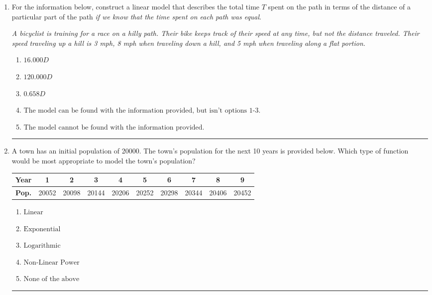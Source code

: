 \documentclass[14pt]{extbook}
\newcommand{\litem}[1]{\item#1\hspace*{-1cm}\rule{\textwidth}{0.4pt}}
\begin{document}
\begin{enumerate}
{\begin{enumerate}[label=\Alph*.]
\end{enumerate} }
\litem{
For the information below, construct a linear model that describes the total time $T$ spent on the path in terms of the distance of a particular part of the path \textit{if we know that the time spent on each path was equal}.
\begin{center}
    \textit{ A bicyclist is training for a race on a hilly path. Their bike keeps track of their speed at any time, but not the distance traveled. Their speed traveling up a hill is 3 mph, 8 mph when traveling down a hill, and 5 mph when traveling along a flat portion. }
\end{center}
\begin{enumerate}[label=\Alph*.]
\item \( 16.000 D \)
\item \( 120.000 D \)
\item \( 0.658 D \)
\item \( \text{The model can be found with the information provided, but isn't options 1-3.} \)
\item \( \text{The model cannot be found with the information provided.} \)

\end{enumerate} }
\litem{
A town has an initial population of 20000. The town's population for the next 10 years is provided below. Which type of function would be most appropriate to model the town's population?


\begin{tabular}{c|c|c|c|c|c|c|c|c|c}
\textbf{Year} & 1 & 2 & 3 & 4 & 5 & 6 & 7 & 8 & 9 \tabularnewline
\hline
\textbf{Pop.} & 20052 & 20098 & 20144 & 20206 & 20252 & 20298 & 20344 & 20406 & 20452
\end{tabular} \begin{enumerate}[label=\Alph*.]
\item \( \text{Linear} \)
\item \( \text{Exponential} \)
\item \( \text{Logarithmic} \)
\item \( \text{Non-Linear Power} \)
\item \( \text{None of the above} \)


\end{enumerate}}
\end{enumerate}
\end{document}
